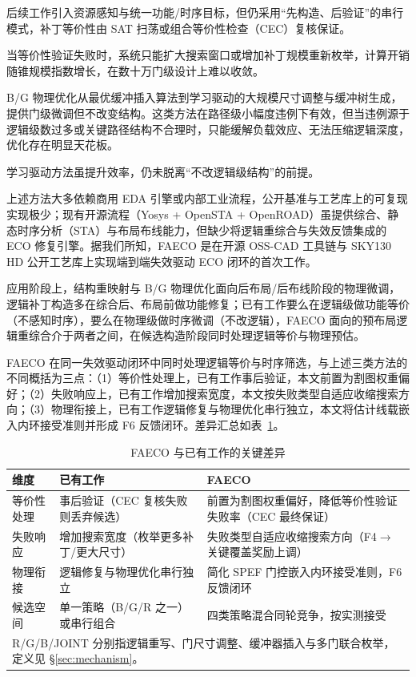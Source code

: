 \documentclass[journal]{IEEEtran}
\begin{document}
后续工作引入资源感知\cite{jiang2016resource}与统一功能/时序目标\cite{lin2011simult,luo2016unified}，但仍采用“先构造、后验证”的串行模式，补丁等价性由 SAT 扫荡或组合等价性检查（CEC）复核保证\cite{mishchenko2006sat,zhong2024stp}。

当等价性验证失败时，系统只能扩大搜索窗口或增加补丁规模重新枚举\cite{zhuo2018patch}，计算开销随锥规模指数增长，在数十万门级设计上难以收敛。

B/G 物理优化从最优缓冲插入算法\cite{liang2012buffer}到学习驱动的大规模尺寸调整与缓冲树生成\cite{liu2021rlsizer,huang2025phys,chen2024aito,zhang2025buffalo}，提供门级微调但不改变结构。这类方法在路径级小幅度违例下有效，但当违例源于逻辑级数过多或关键路径结构不合理时，只能缓解负载效应、无法压缩逻辑深度，优化存在明显天花板\cite{liu2021rlsizer,huang2025phys}。

学习驱动方法\cite{chen2024aito,zhang2025buffalo}虽提升效率，仍未脱离“不改逻辑级结构”的前提。

上述方法大多依赖商用 EDA 引擎或内部工业流程，公开基准与工艺库上的可复现实现极少；现有开源流程（Yosys + OpenSTA + OpenROAD）虽提供综合、静态时序分析（STA）与布局布线能力，但缺少将逻辑重综合与失效反馈集成的 ECO 修复引擎。据我们所知，FAECO 是在开源 OSS-CAD 工具链与 SKY130 HD 公开工艺库上实现端到端失效驱动 ECO 闭环的首次工作。

应用阶段上，结构重映射与 B/G 物理优化面向后布局/后布线阶段的物理微调，逻辑补丁构造多在综合后、布局前做功能修复；已有工作要么在逻辑级做功能等价（不感知时序），要么在物理级做时序微调（不改逻辑），FAECO 面向的预布局逻辑重综合介于两者之间，在候选构造阶段同时处理逻辑等价与物理预估。

FAECO 在同一失效驱动闭环中同时处理逻辑等价与时序筛选，与上述三类方法的不同概括为三点：（1）等价性处理上，已有工作事后验证，本文前置为割图权重偏好；（2）失败响应上，已有工作增加搜索宽度，本文按失败类型自适应收缩搜索方向；（3）物理衔接上，已有工作逻辑修复与物理优化串行独立，本文将估计线载嵌入内环接受准则并形成 F6 反馈闭环。差异汇总如表~\ref{tab:related_diff}。

\begin{table}[!t]
\centering
\caption{FAECO 与已有工作的关键差异}
\label{tab:related_diff}
\footnotesize
\setlength{\tabcolsep}{3pt}
\begin{tabular}{p{2.2cm}p{2.8cm}p{3.2cm}}
\toprule
\textbf{维度} & \textbf{已有工作} & \textbf{FAECO} \\
\midrule
等价性处理 & 事后验证（CEC 复核失败则丢弃候选） & 前置为割图权重偏好，降低等价性验证失败率（CEC 最终保证） \\
失败响应 & 增加搜索宽度（枚举更多补丁/更大尺寸） & 失败类型自适应收缩搜索方向（F4$\to$关键覆盖奖励上调） \\
物理衔接 & 逻辑修复与物理优化串行独立 & 简化 SPEF 门控嵌入内环接受准则，F6 反馈闭环 \\
候选空间 & 单一策略（B/G/R 之一）或串行组合 & 四类策略混合同轮竞争，按实测接受 \\
\bottomrule
\multicolumn{3}{p{8.0cm}}{\footnotesize R/G/B/JOINT 分别指逻辑重写、门尺寸调整、缓冲器插入与多门联合枚举，定义见 \S\ref{sec:mechanism}。}\\
\end{tabular}
\end{table}
\end{document}
